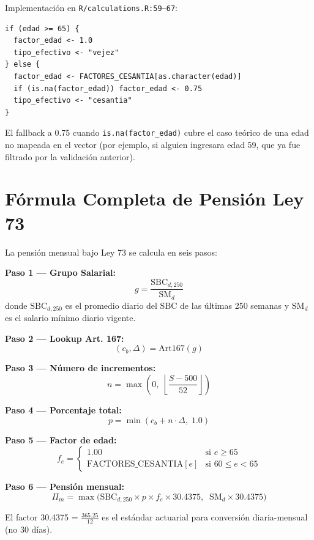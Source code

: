 \documentclass[11pt,a4paper]{report}
\begin{document}
\begin{tcolorbox}[colback=orange!5!white, colframe=orange!75!black, title=\textbf{Aplicaci\'on en C\'odigo}]
Implementaci\'on en \texttt{R/calculations.R:59--67}:

\begin{lstlisting}
if (edad >= 65) {
  factor_edad <- 1.0
  tipo_efectivo <- "vejez"
} else {
  factor_edad <- FACTORES_CESANTIA[as.character(edad)]
  if (is.na(factor_edad)) factor_edad <- 0.75
  tipo_efectivo <- "cesantia"
}
\end{lstlisting}

El fallback a 0.75 cuando \texttt{is.na(factor\_edad)} cubre el caso te\'orico de una edad no mapeada en el vector (por ejemplo, si alguien ingresara edad 59, que ya fue filtrado por la validaci\'on anterior).
\end{tcolorbox}

\section{F\'ormula Completa de Pensi\'on Ley 73}

\begin{tcolorbox}[colback=blue!5!white, colframe=blue!75!black, title=\textbf{Definici\'on Formal}]
La pensi\'on mensual bajo Ley 73 se calcula en seis pasos:

\textbf{Paso 1 --- Grupo Salarial:}
\[
g = \frac{\text{SBC}_{d,250}}{\text{SM}_d}
\]
donde $\text{SBC}_{d,250}$ es el promedio diario del SBC de las \'ultimas 250 semanas y $\text{SM}_d$ es el salario m\'inimo diario vigente.

\textbf{Paso 2 --- Lookup Art. 167:}
\[
(c_b, \Delta) = \text{Art167}(g)
\]

\textbf{Paso 3 --- N\'umero de incrementos:}
\[
n = \max\left(0,\; \left\lfloor\frac{S - 500}{52}\right\rfloor\right)
\]

\textbf{Paso 4 --- Porcentaje total:}
\[
p = \min(c_b + n \cdot \Delta,\; 1.0)
\]

\textbf{Paso 5 --- Factor de edad:}
\[
f_e = \begin{cases}
1.00 & \text{si } e \geq 65 \\
\text{FACTORES\_CESANTIA}[e] & \text{si } 60 \leq e < 65
\end{cases}
\]

\textbf{Paso 6 --- Pensi\'on mensual:}
\[
\Pi_m = \max\!\Big(\text{SBC}_{d,250} \times p \times f_e \times 30.4375,\;\; \text{SM}_d \times 30.4375\Big)
\]

El factor 30.4375 = $\frac{365.25}{12}$ es el est\'andar actuarial para conversi\'on diaria-mensual (no 30 d\'ias).
\end{tcolorbox}
\end{document}
